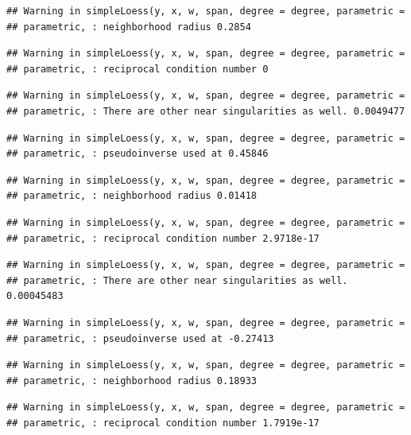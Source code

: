 \documentclass[]{article}
\begin{document}
\begin{verbatim}
## Warning in simpleLoess(y, x, w, span, degree = degree, parametric =
## parametric, : neighborhood radius 0.2854
\end{verbatim}

\begin{verbatim}
## Warning in simpleLoess(y, x, w, span, degree = degree, parametric =
## parametric, : reciprocal condition number 0
\end{verbatim}

\begin{verbatim}
## Warning in simpleLoess(y, x, w, span, degree = degree, parametric =
## parametric, : There are other near singularities as well. 0.0049477
\end{verbatim}

\begin{verbatim}
## Warning in simpleLoess(y, x, w, span, degree = degree, parametric =
## parametric, : pseudoinverse used at 0.45846
\end{verbatim}

\begin{verbatim}
## Warning in simpleLoess(y, x, w, span, degree = degree, parametric =
## parametric, : neighborhood radius 0.01418
\end{verbatim}

\begin{verbatim}
## Warning in simpleLoess(y, x, w, span, degree = degree, parametric =
## parametric, : reciprocal condition number 2.9718e-17
\end{verbatim}

\begin{verbatim}
## Warning in simpleLoess(y, x, w, span, degree = degree, parametric =
## parametric, : There are other near singularities as well. 0.00045483
\end{verbatim}

\begin{verbatim}
## Warning in simpleLoess(y, x, w, span, degree = degree, parametric =
## parametric, : pseudoinverse used at -0.27413
\end{verbatim}

\begin{verbatim}
## Warning in simpleLoess(y, x, w, span, degree = degree, parametric =
## parametric, : neighborhood radius 0.18933
\end{verbatim}

\begin{verbatim}
## Warning in simpleLoess(y, x, w, span, degree = degree, parametric =
## parametric, : reciprocal condition number 1.7919e-17
\end{verbatim}
\end{document}

